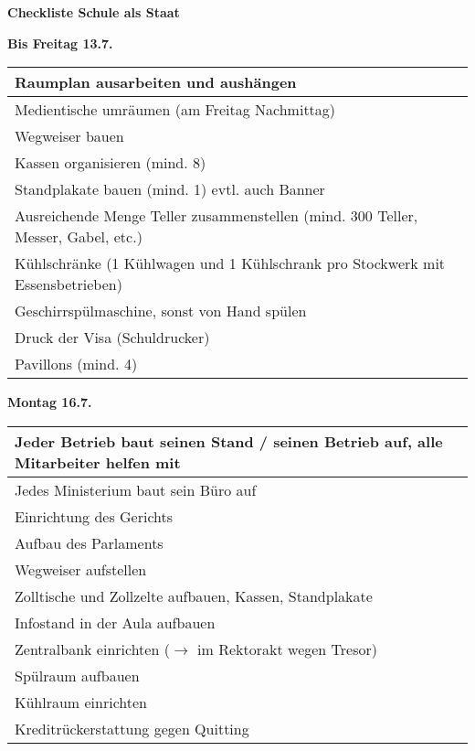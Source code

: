 \documentclass[12pt]{article}
\begin{document}
\renewcommand{\arraystretch}{1.5}

\textbf{\LARGE{Checkliste Schule als Staat}}
\vspace{5mm}

\textbf{Bis Freitag 13.7.}

\vspace{5mm}

\begin{tabular}{|p{15cm}|p{3cm}|}
    \hline
    Raumplan ausarbeiten und aushängen & \\ \hline
    Medientische umräumen (am Freitag Nachmittag) & \\ \hline
    Wegweiser bauen & \\ \hline
    Kassen organisieren (mind. 8) & \\ \hline
    Standplakate bauen (mind. 1) evtl. auch Banner & \\ \hline
    Ausreichende Menge Teller zusammenstellen (mind. 300 Teller, Messer, Gabel, etc.) & \\ \hline
    Kühlschränke (1 Kühlwagen und 1 Kühlschrank pro Stockwerk mit Essensbetrieben) & \\ \hline
    Geschirrspülmaschine, sonst von Hand spülen & \\ \hline
    Druck der Visa (Schuldrucker) & \\ \hline
    Pavillons (mind. 4) & \\ \hline
\end{tabular}

\vspace{5mm}

\textbf{Montag 16.7.}

\vspace{5mm}

\begin{tabular}{|p{15cm}|p{3cm}|}
    \hline
    Jeder Betrieb baut seinen Stand / seinen Betrieb auf, alle Mitarbeiter helfen mit & \\ \hline
    Jedes Ministerium baut sein Büro auf                    & \\ \hline
    Einrichtung des Gerichts                                & \\ \hline
    Aufbau des Parlaments                                   & \\ \hline
    Wegweiser aufstellen                                    & \\ \hline
    Zolltische und Zollzelte aufbauen, Kassen, Standplakate & \\ \hline
    Infostand in der Aula aufbauen                          & \\ \hline
    Zentralbank einrichten ($\rightarrow$ im Rektorakt wegen Tresor) & \\ \hline
    Spülraum aufbauen                                       & \\ \hline
    Kühlraum einrichten & \\ \hline
    Kreditrückerstattung gegen Quitting & \\ \hline
\end{tabular}
\vspace{5mm}
\end{document}
